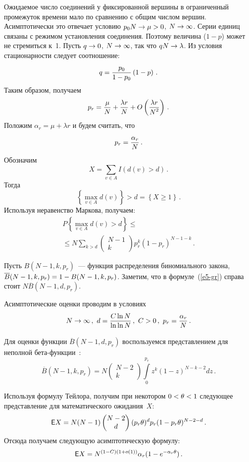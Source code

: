 \begin{multicols}{2}
     Ожидаемое число соединений у фиксированной вершины в ограниченный 
промежуток времени мало по сравнению с общим числом вершин. Асимптотически это 
отвечает условию $p_0 N\hm\rightarrow \mu\hm>0$, $N\hm\rightarrow\infty$. Серии единиц 
связаны с режимом установления соединения. Поэтому величина ($1-p$) может не 
стремиться к~1. Пусть $q\hm\rightarrow 0$, $N\hm\rightarrow\infty$, так что 
$qN\hm\rightarrow\lambda$. Из условия стационарности следует соотношение:
     $$
     q=\displaystyle\frac{\displaystyle p_0\mathstrut}{\displaystyle 1-p_0\mathstrut}\left( 1-p\right)\,.
     $$
Таким образом, получаем
$$
p_r=\displaystyle\frac{\displaystyle \mu\mathstrut}{\displaystyle N\mathstrut}+\displaystyle\frac{\displaystyle \lambda r\mathstrut}{\displaystyle N\mathstrut}+O\left( \displaystyle\frac{\displaystyle \lambda r\mathstrut}{\displaystyle N^2\mathstrut}\right)\,.
$$
Положим $\alpha_r=\mu+\lambda r$ и будем считать, что
$$
p_r=\displaystyle\frac{\displaystyle \alpha_r\mathstrut}{\displaystyle N\mathstrut}\,.
$$
Обозначим 
$$
X=\sum\limits_{v\in A} I(d(v)>d)\,.
$$
Тогда 
$$
\left\{ \max\limits_{v\in A} d(v)\right\} >d =\left\{ X\geq 1\right\}\,.
$$
Используя неравенство Маркова, получаем:
\begin{multline}
P\left\{ \max\limits_{v\in A} d(v)>d\right\} \leq{}\\
{}\leq N\sum\limits_{k>d}\begin{pmatrix}
N-1\\ k\end{pmatrix} p_r^k(1-p_r)^{N-1-k}\,.
\label{e5-gr}
\end{multline}
     
     Пусть $B(N-1, k, p_r)$~--- функция распределения биномиального закона, 
$\overline{B}(N-1, k, p_r)\hm=1 \hm- B(N-1, k, p_r)$. Заметим, что в формуле~(\ref{e5-gr}) 
справа стоит $N\overline{B} (N-1, d, p_r)$. 
     
     Асимптотические оценки проводим в условиях
     $$
     N\rightarrow\infty\,, \ d=\displaystyle\frac{\displaystyle C\ln N\mathstrut}{\displaystyle \ln\ln N\mathstrut}\,,\ C>0\,,\ p_r=\displaystyle\frac{\displaystyle \alpha_r\mathstrut}{\displaystyle N\mathstrut}\,.
     $$
     
     Для оценки функции $\overline{B} (N-1, d, p_r)$ воспользуемся представлением для 
неполной бе\-та-функ\-ции~\cite{14-gr}:
     $$
     \overline{B}(N-1,k,p_r)=N\begin{pmatrix}
     N-2\\ k \end{pmatrix} \int\limits_0^{p_r} z^k (1-z)^{N-k-2}dz\,.
     $$
     
     Используя формулу Тейлора, получим при некотором $0\hm<\theta\hm<1$ 
следующее представление для математического ожидания~$X$:
     $$
     {\sf E}X=N(N-1)\begin{pmatrix}
     N-2\\ d\end{pmatrix} (p_r\theta)^d p_r(1-p_r\theta)^{N-2-d}\,.
     $$
Отсюда получаем следующую асимптотическую формулу:
\begin{equation}
{\sf E}X=N^{(1-C)(1+o(1))}\alpha_r(1-e^{-\alpha_r\theta})\,.
\label{e6-gr}
     \end{equation}
     

\end{multicols}
